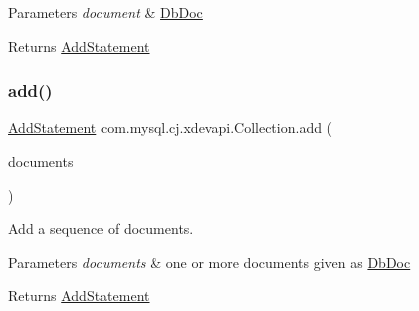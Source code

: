 \begin{DoxyParams}{Parameters}
{\em document} & \mbox{\hyperlink{interfacecom_1_1mysql_1_1cj_1_1xdevapi_1_1_db_doc}{Db\+Doc}} \\
\hline
\end{DoxyParams}
\begin{DoxyReturn}{Returns}
\mbox{\hyperlink{interfacecom_1_1mysql_1_1cj_1_1xdevapi_1_1_add_statement}{Add\+Statement}} 
\end{DoxyReturn}
\mbox{\label{interfacecom_1_1mysql_1_1cj_1_1xdevapi_1_1_collection_acb233dbad895da2bf9fbe3b26627075c}} 
\subsubsection{\texorpdfstring{add()}{add()}\hspace{0.1cm}{\footnotesize\ttfamily [4/4]}}
{\footnotesize\ttfamily \mbox{\hyperlink{interfacecom_1_1mysql_1_1cj_1_1xdevapi_1_1_add_statement}{Add\+Statement}} com.\+mysql.\+cj.\+xdevapi.\+Collection.\+add (\begin{DoxyParamCaption}\item[{Db\+Doc...}]{documents }\end{DoxyParamCaption})}

Add a sequence of documents.


\begin{DoxyParams}{Parameters}
{\em documents} & one or more documents given as \mbox{\hyperlink{interfacecom_1_1mysql_1_1cj_1_1xdevapi_1_1_db_doc}{Db\+Doc}} \\
\hline
\end{DoxyParams}
\begin{DoxyReturn}{Returns}
\mbox{\hyperlink{interfacecom_1_1mysql_1_1cj_1_1xdevapi_1_1_add_statement}{Add\+Statement}} 
\end{DoxyReturn}
\mbox{\label{interfacecom_1_1mysql_1_1cj_1_1xdevapi_1_1_collection_a5b6db06712b9a26fa1f33860ad37301f}} 
